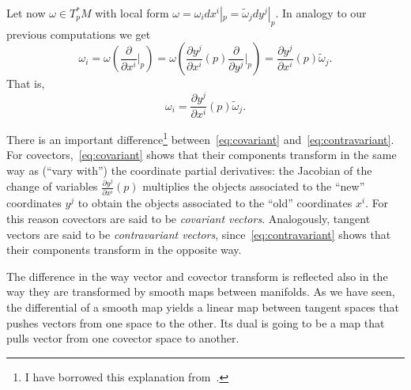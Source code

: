 Let now $\omega\in T_p^*M$ with local form $\omega = \omega_i dx^i|_p = \widetilde \omega_j dy^j|_p$.
In analogy to our previous computations we get
\begin{equation}
	\omega_i
	= \omega\left(\frac{\partial}{\partial x^i}\Big|_p\right)
	= \omega\left(\frac{\partial y^j}{\partial x^i}(p) \frac{\partial}{\partial y^j}\Big|_p\right)
	= \frac{\partial y^j}{\partial x^i}(p) \widetilde\omega_j.
\end{equation}
That is,
\begin{equation}\label{eq:covariant}
	\omega_i = \frac{\partial y^j}{\partial x^i}(p) \widetilde\omega_j.
\end{equation}

There is an important difference\footnote{I have borrowed this explanation from~\cite[Chapter 11]{book:lee}.} between~\eqref{eq:covariant} and~\eqref{eq:contravariant}.
For covectors,~\eqref{eq:covariant} shows that their components transform in the same way as (``vary with'') the coordinate partial derivatives: the Jacobian of the change of variables $\frac{\partial y^j}{\partial x^i}(p)$ multiplies the objects associated to the ``new'' coordinates $y^j$ to obtain the objects associated to the ``old'' coordinates $x^i$.
For this reason covectors are said to be \emph{covariant vectors}.
Analogously, tangent vectors are said to be \emph{contravariant vectors}, since~\eqref{eq:contravariant} shows that their components transform in the opposite way.

The difference in the way vector and covector transform is reflected also in the way they are transformed by smooth maps between manifolds.
As we have seen, the differential of a smooth map yields a linear map between tangent spaces that pushes vectors from one space to the other.
Its dual is going to be a map that pulls vector from one covector space to another.

